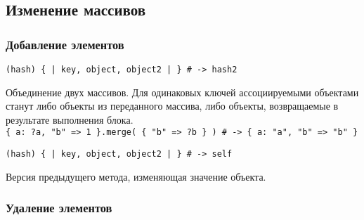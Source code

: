 \subsection*{Изменение массивов}

\subsubsection*{Добавление элементов}

\begin{methodlist} 
  \verb!(hash) { | key, object, object2 | } # -> hash2!

  Объединение двух массивов. Для одинаковых ключей ассоциируемыми объектами станут либо объекты из переданного массива, либо объекты, возвращаемые в результате выполнения блока.
  \\\verb!{ a: ?a, "b" => 1 }.merge( { "b" => ?b } ) # -> { a: "a", "b" => "b" }!

  \verb!(hash) { | key, object, object2 | } # -> self!

  Версия предыдущего метода, изменяющая значение объекта. 
\end{methodlist}

\subsubsection*{Удаление элементов}

